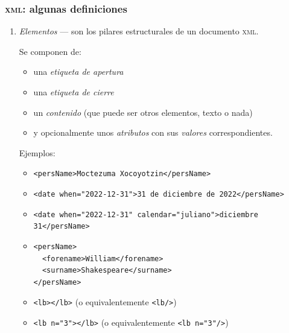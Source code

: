\documentclass[%
  handout, %
  ]{beamer}
\newcommand*{\rojoit}[1]{\textit{\textcolor[HTML]{8B0000}{#1}}}
\newcommand*{\XML}{\textsc{xml}}
\begin{document}
\begin{frame}[fragile]
  \frametitle{\XML: algunas definiciones}
  \begin{enumerate}
    \item \rojoit{Elementos} --- son los pilares estructurales de un documento \XML.

      Se componen de:
      \begin{itemize}
        \item una \textit{etiqueta de apertura}
        \item una \textit{etiqueta de cierre}
        \item un \textit{contenido} (que puede ser otros elementos, texto o nada)
        \item y opcionalmente unos \textit{atributos} con sus \textit{valores} correspondientes.
      \end{itemize}
      Ejemplos:

      \begin{itemize}
        \item \texttt{<persName>Moctezuma Xocoyotzin</persName>}
        \item \texttt{<date when="2022-12-31">31 de diciembre de 2022</persName>}
        \item \texttt{<date when="2022-12-31" calendar="juliano">diciembre 31</persName>}
        \item
\begin{verbatim}
<persName>
  <forename>William</forename>
  <surname>Shakespeare</surname>
</persName>
\end{verbatim}
          
        \item \texttt{<lb></lb>} (o equivalentemente \texttt{<lb/>})
        \item \texttt{<lb n="3"></lb>} (o equivalentemente \texttt{<lb n="3"/>})
      \end{itemize}
  \end{enumerate}
\end{frame}
\end{document}
